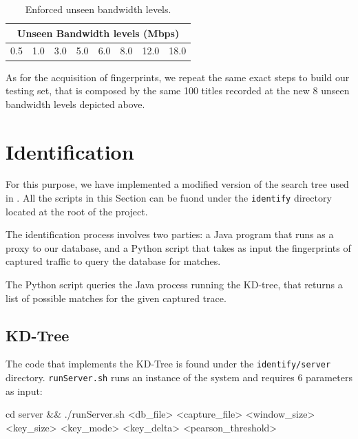 \begin{table}[htb]
  \centering
  \begin{tabular}{|c|c|c|c|c|c|c|c|}
    \hline
    \multicolumn{8}{|c|}{\textbf{Unseen Bandwidth levels (Mbps)}} \\
    \hline
    0.5 & 1.0 & 3.0 & 5.0 & 6.0 & 8.0 & 12.0 & 18.0 \\
    \hline
  \end{tabular}
  \caption{Enforced unseen bandwidth levels.}
  \label{tab:unseen_bandwidths}
\end{table}

As for the acquisition of fingerprints, we repeat the same exact steps to build
our testing set, that is composed by the same 100 titles recorded at the new 8
unseen bandwidth levels depicted above. 

\section{Identification}

For this purpose, we have implemented a modified version of the search tree
used in \cite{netflix-real-time}. All the scripts in this Section can be fuond
under the \texttt{identify} directory located at the root of the project.

The identification process involves two parties: a Java program that runs as
a proxy to our database, and a Python script that takes as input the
fingerprints of captured traffic to query the database for matches.

The Python script queries the Java process running the KD-tree, that returns a
list of possible matches for the given captured trace.


\subsection{KD-Tree}\label{sec:KD}

The code that implements the KD-Tree is found under the \texttt{identify/server}
directory. \texttt{runServer.sh} runs an instance of the system and requires 6
parameters as input:

\begin{bash_script}[caption={Start the Java Server}, label={lst:java}]
        cd server && ./runServer.sh <db_file> <capture_file> <window_size> <key_size> <key_mode> <key_delta> <pearson_threshold>
\end{bash_script}

